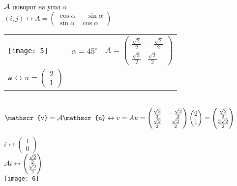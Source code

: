 \documentclass[../spring.tex]{subfiles}
\begin{document}
	\begin{examples}\ \\
		\begin{mylist}
			\item 
			$\mathcal{A}$ поворот на угол $\alpha$\\
			$(i, j) \leftrightarrow A = \begin{pmatrix}
			\cos\alpha & -\sin\alpha\\\sin\alpha & \cos\alpha
			\end{pmatrix}$
			\\
			\begin{tabular}{lcc}
				\texttt{[image: 5]} &
				$\alpha=45^{\circ}$ &
				$A = \begin{pmatrix}
				\frac{\sqrt2}{2} & -\frac{\sqrt2}{2}\\
				\frac{\sqrt2}{2} & \frac{\sqrt2}{2}\end{pmatrix}$\\
				$\mathscr{u} \leftrightarrow u = \begin{pmatrix}2\\1\end{pmatrix}$
			\end{tabular}
			\\
			$\mathscr{v} = \A \mathscr{u} \leftrightarrow v = Au = \begin{pmatrix}
			\frac{\sqrt2}{2} & -\frac{\sqrt2}{2}\\
			\frac{\sqrt2}{2} & \frac{\sqrt2}{2}
			\end{pmatrix}\begin{pmatrix}2\\1\end{pmatrix} = \begin{pmatrix}
			\frac{\sqrt 2}{2}\\
			\frac{3\sqrt 2}{2}
			\end{pmatrix}$\\
			\begin{multicols}{2}
				$i \leftrightarrow \begin{pmatrix}
				1\\0
				\end{pmatrix}$\\
				$\mathcal{A} i \leftrightarrow \begin{pmatrix}
				\frac{\sqrt 2}{2}\\
				\frac{\sqrt 2}{2}
				\end{pmatrix}$\\
				\texttt{[image: 6]}\\

\end{multicols}
\end{mylist}
\end{examples}
\end{document}
